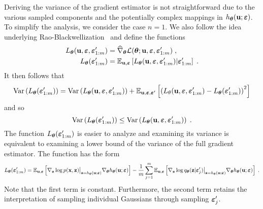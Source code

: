 \documentclass[10pt]{article}
\begin{document}
Deriving the variance of the gradient estimator is not straightforward due to the various sampled components and the potentially complex mappings in $h_{\bm{\theta}}(\mathbf{u};\bm{\varepsilon})$. To simplify the analysis, we consider the case $n=1$. We also follow the idea underlying Rao-Blackwellization~\citep{Ranganath:2014} and define the functions
\begin{align*}
L_{\bm{\theta}}(\mathbf{u},\bm{\varepsilon},\bm{\varepsilon}_{1:m}') &= \widehat{\nabla}_{\bm{\theta}}\mathcal{L}({\bm{\theta}};\mathbf{u},\bm{\varepsilon},\bm{\varepsilon}_{1:m}') \;, \\
L_{\bm{\theta}}(\bm{\varepsilon}_{1:m}') &= \mathbb{E}_{\mathbf{u},\bm{\varepsilon}}\left[L_{\bm{\theta}}(\mathbf{u},\bm{\varepsilon},\bm{\varepsilon}_{1:m}')|\bm{\varepsilon}_{1:m}'\right] \;.
\end{align*}
It then follows that
\[
\mathrm{Var}\left(L_{\bm{\theta}}(\bm{\varepsilon}_{1:m}')\right) = \mathrm{Var}\left(L_{\bm{\theta}}(\mathbf{u},\bm{\varepsilon},\bm{\varepsilon}_{1:m}')\right) + \mathbb{E}_{\mathbf{u},\bm{\varepsilon},\bm{\varepsilon}'}\left[\left(L_\theta(\mathbf{u},\bm{\varepsilon},\bm{\varepsilon}_{1:m}')-L_{\bm{\theta}}(\bm{\varepsilon}_{1:m}')\right)^2\right]
\]
and so
\[
\mathrm{Var}\left(L_{\bm{\theta}}(\bm{\varepsilon}_{1:m}')\right) \leq \mathrm{Var}\left(L_{\bm{\theta}}(\mathbf{u},\bm{\varepsilon},\bm{\varepsilon}_{1:m}')\right) \;.
\]
The function $L_{\bm{\theta}}(\bm{\varepsilon}_{1:m}')$ is easier to analyze and examining its variance is equivalent to examining a lower bound of the variance of the full gradient estimator. The function has the form
\[
L_{\bm{\theta}}(\bm{\varepsilon}_{1:m}') = \mathbb{E}_{\mathbf{u},\bm{\varepsilon}}\left[\nabla_{\mathbf{z}}\log p(\mathbf{x},\mathbf{z})\big|_{\mathbf{z}=h_{\bm{\theta}}(\mathbf{u};\bm{\varepsilon})}\nabla_{\bm{\theta}} h_{\bm{\theta}}(\mathbf{u};\bm{\varepsilon})\right] - \frac{1}{m}\sum_{j=1}^m\mathbb{E}_{\mathbf{u},\bm{\varepsilon}}\left[\nabla_{\mathbf{z}}\log q_{\bm{\theta}}(\mathbf{z}|\bm{\varepsilon}_j')\big|_{\mathbf{z}=h_{\bm{\theta}}(\mathbf{u};\bm{\varepsilon})} \nabla_{\bm{\theta}} h_{\bm{\theta}}(\mathbf{u};\bm{\varepsilon})\right] \;.
\]
Note that the first term is constant. Furthermore, the second term retains the interpretation of sampling individual Gaussians through sampling $\bm{\varepsilon}_j'$.
\\
\end{document}
